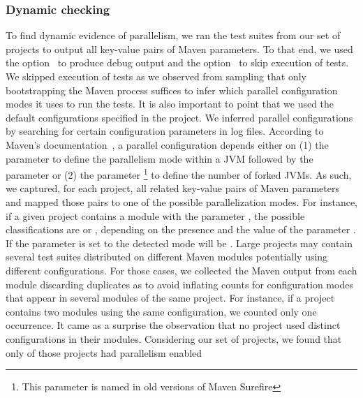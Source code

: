 
\vspace{1ex}
\subsubsection{Dynamic checking}
\label{sec:rqC-1}

To find dynamic evidence of parallelism, we ran the test suites from
our set of \numMedLong{} projects to output all key-value pairs of
Maven parameters.  To that end, we used the option~ to
produce debug output and the option~ to skip
execution of tests.  We skipped execution of tests as we observed from
sampling that only bootstrapping the Maven process suffices to infer
which parallel configuration modes it uses to run the
tests.  It is also important to point that we used the default
configurations specified in the project.  We inferred parallel
configurations by searching for certain configuration parameters in
log files. According to Maven's
documentation~\cite{maven-surefire-plugin}, a parallel configuration
depends either on (1) the parameter  to define the
parallelism mode within a JVM followed by the parameter
 or (2) the parameter
\footnote{This parameter is named 
  in old versions of Maven Surefire} to define the number of forked
JVMs.  As such, we captured, for each project, all related key-value
pairs of Maven parameters and mapped those pairs to one of the
possible parallelization modes.  For instance, if a given project
contains a module with the parameter
, the possible classifications are
\ForkSeq{} or \ForkParMeth{}, depending on the presence and the value
of the parameter .  If the parameter
 is set to  the detected mode will be
\ForkParMeth{}.  Large projects may contain several test suites
distributed on different Maven modules potentially using different
configurations.  For those cases, we collected the Maven output from
each module discarding duplicates as to avoid inflating counts for
configuration modes that appear in several modules of the same
project. For instance, if a project contains two modules using the
same configuration, we counted only one occurrence.
It came as a surprise the observation that
no project used distinct configurations in their modules. Considering
our set of \numMedLong{} projects, we found that only
\numProjectsPar{} of those projects had parallelism enabled
